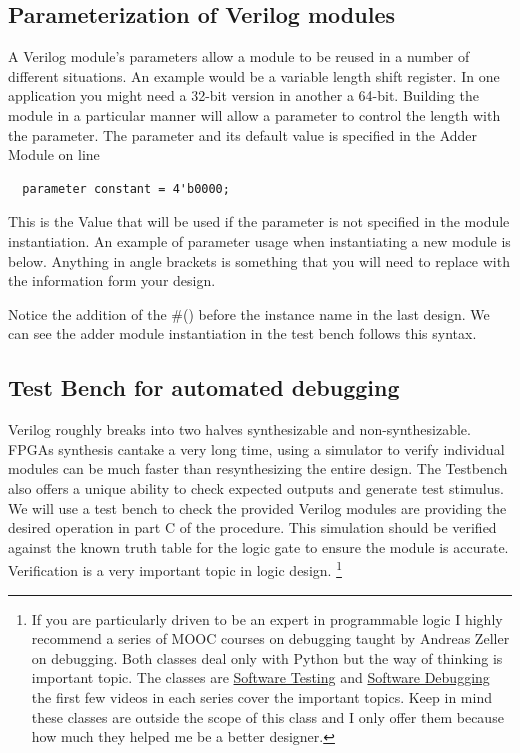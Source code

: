     
    \subsection{Parameterization of Verilog modules}
      A Verilog module's parameters allow a module to be reused in a number of different situations. An example would be a variable length shift register. In one application you might need a 32-bit version in another a 64-bit. Building the module in a particular manner will allow a parameter to control the length with the parameter. The parameter and its default value is specified in the Adder Module on line
      \begin{lstlisting}
  parameter constant = 4'b0000;
      \end{lstlisting}
      This is the Value that will be used if the parameter is not specified in the module instantiation. An example of parameter usage when instantiating a new module is below. Anything in angle brackets is something that you will need to replace with the information form your design.
      

    Notice the addition of the \#() before the instance name in the last design. We can see the adder module instantiation in the test bench follows this syntax.
    

    \subsection{Test Bench for automated debugging}
      Verilog roughly breaks into two halves synthesizable and non-synthesizable. FPGAs synthesis cantake a very long time, using a simulator to verify individual modules can be much faster than resynthesizing the entire design. The Testbench also offers a unique ability to check expected outputs and generate test stimulus. We will use a test bench to check the provided Verilog modules are providing the desired operation in part C of the procedure. This simulation should be verified against the known truth table for the logic gate to ensure the module is accurate. Verification is a very important topic in logic design. \footnote{If you are particularly driven to be an expert in programmable logic I highly recommend a series of MOOC courses on debugging taught by Andreas Zeller on debugging. Both classes deal only with Python but the way of thinking is important topic. The classes are \href{https://www.udacity.com/course/cs258}{Software Testing} and \href{https://www.udacity.com/course/cs259}{Software Debugging} the first few videos in each series cover the important topics. Keep in mind these classes are outside the scope of this class and I only offer them because how much they helped me be a better designer.}


